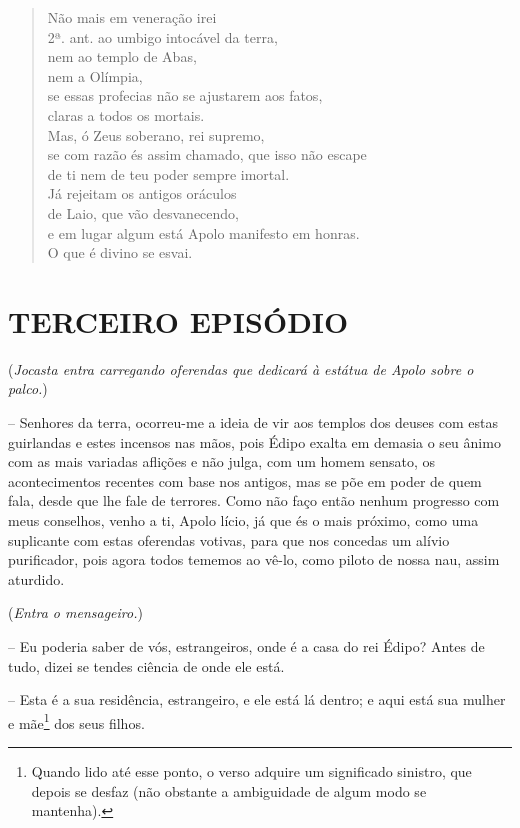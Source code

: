 \begin{verse}
Não mais em veneração irei\\ 2ª. ant.
ao umbigo intocável da terra,\\
nem ao templo de Abas,\\ 
nem a Olímpia,\\
se essas profecias não se ajustarem aos fatos,\\
claras a todos os mortais.\\
Mas, ó Zeus soberano, rei supremo,\\
se com razão és assim chamado, que isso não escape\\
de ti nem de teu poder sempre imortal.\\
Já rejeitam os antigos oráculos\\
de Laio, que vão desvanecendo,\\
e em lugar algum está Apolo manifesto em honras.\\
O que é divino se esvai. 
\end{verse}

\section{TERCEIRO EPISÓDIO}

(\emph{Jocasta entra carregando oferendas que dedicará à estátua de
Apolo sobre o palco.})

 --   Senhores da terra, ocorreu-me a ideia de vir aos templos dos deuses com
estas guirlandas e estes incensos nas mãos, pois Édipo exalta em demasia
o seu ânimo com as mais variadas aflições e não julga, com um homem
sensato, os acontecimentos recentes com base nos antigos, mas se põe em
poder de quem fala, desde que lhe fale de terrores. Como não faço então
nenhum progresso com meus conselhos, venho a ti, Apolo lício,  já
que és o mais próximo, como uma suplicante com estas oferendas votivas,
para que nos concedas um alívio purificador, pois agora todos tememos ao
vê-lo, como piloto de nossa nau, assim aturdido.

(\emph{Entra o mensageiro.})

 --   Eu poderia saber de vós, estrangeiros, onde é a casa do rei Édipo? Antes
de tudo, dizei se tendes ciência de onde ele está.

 --   Esta é a sua residência, estrangeiro, e ele está lá dentro; e aqui está
sua mulher e mãe\footnote{Quando lido até esse ponto, o verso adquire um
  significado sinistro, que depois se desfaz (não obstante a ambiguidade
  de algum modo se mantenha).} dos seus filhos.

